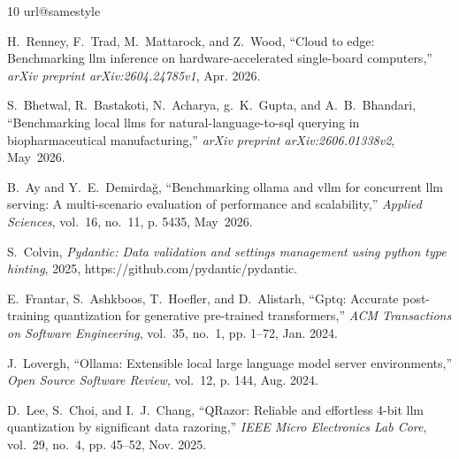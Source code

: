 \documentclass[11pt,journal,compsoc,onecolumn]{IEEEtran}
\begin{document}
\begin{thebibliography}{10}
\providecommand{\url}[1]{#1}
\csname url@samestyle\endcsname
\providecommand{\newblock}{\relax}
\providecommand{\bibinfo}[2]{#2}
\providecommand{\BIBentrySTDinterwordspacing}{\spaceskip=0pt\relax}
\providecommand{\BIBentryALTinterwordstretchfactor}{4}
\providecommand{\BIBentryALTinterwordspacing}{\spaceskip=\fontdimen2\font \fontdimen3\font \fontdimen4\font \spaceskip=\BIBentryALTinterwordstretchfactor\fontdimen3\font \relax}
\providecommand{\BIBforeignlanguage}[2]{{#2}}
\providecommand{\BIBdecl}{\relax}
\BIBdecl

H.~Renney, F.~Trad, M.~Mattarock, and Z.~Wood, ``Cloud to edge: Benchmarking llm inference on hardware-accelerated single-board computers,'' \emph{arXiv preprint arXiv:2604.24785v1}, Apr. 2026.

S.~Bhetwal, R.~Bastakoti, N.~Acharya, g.~K.~Gupta, and A.~B.~Bhandari, ``Benchmarking local llms for natural-language-to-sql querying in biopharmaceutical manufacturing,'' \emph{arXiv preprint arXiv:2606.01338v2}, May~2026.

B.~Ay and Y.~E.~Demirda{\u{g}}, ``Benchmarking ollama and vllm for concurrent llm serving: A multi-scenario evaluation of performance and scalability,'' \emph{Applied Sciences}, vol.~16, no.~11, p. 5435, May~2026.

S.~Colvin, \emph{Pydantic: Data validation and settings management using python type hinting}, 2025, \url{https://github.com/pydantic/pydantic}.

E.~Frantar, S.~Ashkboos, T.~Hoefler, and D.~Alistarh, ``Gptq: Accurate post-training quantization for generative pre-trained transformers,'' \emph{ACM Transactions on Software Engineering}, vol.~35, no.~1, pp. 1--72, Jan. 2024.

J.~Lovergh, ``Ollama: Extensible local large language model server environments,'' \emph{Open Source Software Review}, vol.~12, p. 144, Aug. 2024.

D.~Lee, S.~Choi, and I.~J.~Chang, ``QRazor: Reliable and effortless 4-bit llm quantization by significant data razoring,'' \emph{IEEE Micro Electronics Lab Core}, vol.~29, no.~4, pp. 45--52, Nov. 2025.

\end{thebibliography}
\end{document}
